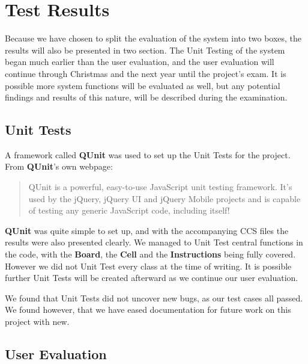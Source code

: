 \section{Test Results}
\label{sec:testresults}

Because we have chosen to split the evaluation of the system into two boxes, the results will also be presented in two section. The Unit Testing of the system began much earlier than the user evaluation, and the user evaluation will continue through Christmas and the next year until the project's exam. It is possible more system functions will be evaluated as well, but any potential findings and results of this nature, will be described during the examination.

\subsection{Unit Tests}

A framework called \textbf{QUnit} was used to set up the Unit Tests for the project.
From \textbf{QUnit}'s own webpage:

\begin{quotation}
QUnit is a powerful, easy-to-use JavaScript unit testing framework. It's used by the jQuery, jQuery UI and jQuery Mobile projects and is capable of testing any generic JavaScript code, including itself!\cite{qunit}
\end{quotation}

\textbf{QUnit} was quite simple to set up, and with the accompanying CCS files the results were also presented clearly. We managed to Unit Test central functions in the code, with the \textbf{Board}, the \textbf{Cell} and the \textbf{Instructions} being fully covered.  However we did not Unit Test every class at the time of writing. It is possible further Unit Tests will be created afterward as we continue our user evaluation.


We found that Unit Tests did not uncover new bugs, as our test cases all passed. We found however, that we have eased documentation for future work on this project with new.


\subsection{User Evaluation}

